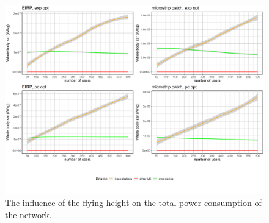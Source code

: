 \begin{figure}[h!]
  \includegraphics[width=\textwidth]{../results/s3/uFourSources.png}
  \caption{The influence of the flying height on the total power consumption of the network.}
  \label{fig:s3fhvspc}
\end{figure}
